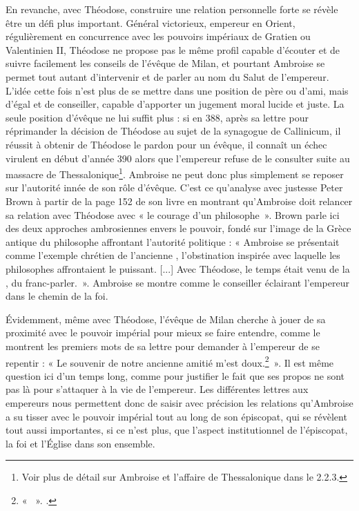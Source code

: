 \bigskip

En revanche, avec Théodose, construire une relation personnelle forte se révèle être un défi plus important. Général victorieux, empereur en Orient, régulièrement en concurrence avec les pouvoirs impériaux de Gratien ou Valentinien II, Théodose ne propose pas le même profil capable d'écouter et de suivre facilement les conseils de l'évêque de Milan, et pourtant Ambroise se permet tout autant d'intervenir et de parler au nom du Salut de l'empereur. L'idée cette fois n'est plus de se mettre dans une position de père ou d'ami, mais d'égal et de conseiller, capable d'apporter un jugement moral lucide et juste. La seule position d'évêque ne lui suffit plus : si en 388, après sa lettre pour réprimander la décision de Théodose au sujet de la synagogue de Callinicum, il réussit à obtenir de Théodose le pardon pour un évêque, il connaît un échec virulent en début d'année 390 alors que l'empereur refuse de le consulter suite au massacre de Thessalonique\footnote{Voir plus de détail sur Ambroise et l'affaire de Thessalonique dans le 2.2.3.}. Ambroise ne peut donc plus simplement se reposer sur l'autorité innée de son rôle d'évêque. C'est ce qu'analyse avec justesse Peter Brown à partir de la page 152 de son livre  en montrant qu'Ambroise doit relancer sa relation avec Théodose avec « le courage d'un philosophe~». Brown parle ici des deux approches ambrosiennes envers le pouvoir, fondé sur l'image de la Grèce antique du philosophe affrontant l'autorité politique : « Ambroise se présentait comme l’exemple chrétien de l’ancienne , l’obstination inspirée avec laquelle les philosophes affrontaient le puissant. [...] Avec Théodose, le temps était venu de la , du franc-parler.\autocite[155]{brown_power_1992}~». Ambroise se montre comme le conseiller éclairant l'empereur dans le chemin de la foi.

\bigskip

Évidemment, même avec Théodose, l'évêque de Milan cherche à jouer de sa proximité avec le pouvoir impérial pour mieux se faire entendre, comme le montrent les premiers mots de sa lettre pour demander à l'empereur de se repentir : « Le souvenir de notre ancienne amitié m'est doux.\footnote{« ~». \cite[\nopp ec. 11, 1]{ambroise_csel_82_3}.}~». Il est même question ici d'un temps long, comme pour justifier le fait que ses propos ne sont pas là pour s'attaquer à la vie de l'empereur. Les différentes lettres aux empereurs nous permettent donc de saisir avec précision les relations qu'Ambroise a su tisser avec le pouvoir impérial tout au long de son épiscopat, qui se révèlent tout aussi importantes, si ce n'est plus, que l'aspect institutionnel de l'épiscopat, la foi et l'Église dans son ensemble.

